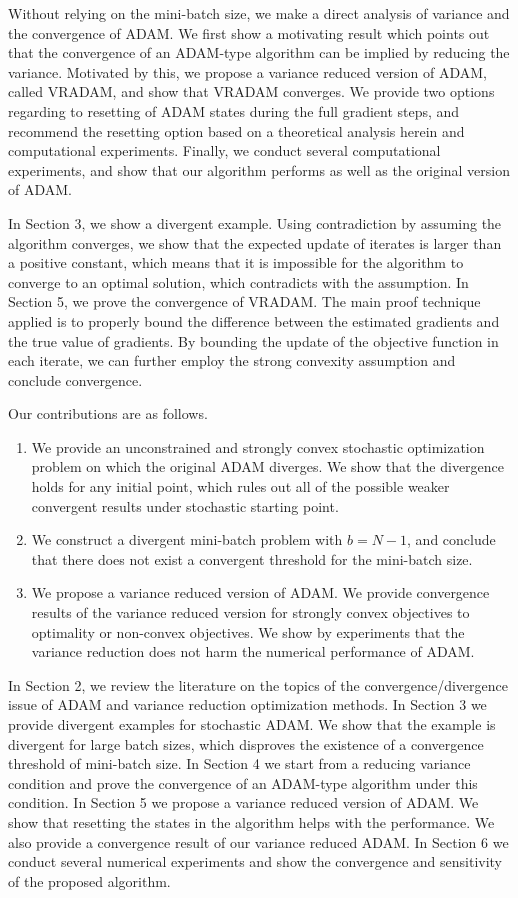 \documentclass[twoside]{article}
\begin{document}
Without relying on the mini-batch size, we make a direct analysis of variance and the convergence of ADAM. We first show a motivating result which points out that the convergence of an ADAM-type algorithm can be implied by reducing the variance. Motivated by this, we propose a variance reduced version of ADAM, called VRADAM, and show that VRADAM converges. We provide two options regarding to resetting of ADAM states during the full gradient steps, and recommend the resetting option based on a theoretical analysis herein and computational experiments. Finally, we conduct several computational experiments, and show that our algorithm performs as well as the original version of ADAM.

In Section 3, we show a divergent example. Using contradiction by assuming the algorithm converges, we show that the expected update of iterates is larger than a positive constant, which means that it is impossible for the algorithm to converge to an optimal solution, which contradicts with the assumption. In Section 5, we prove the convergence of VRADAM. The main proof technique applied is to properly bound the difference between the estimated gradients and the true value of gradients. By bounding the update of the objective function in each iterate, we can further employ the strong convexity assumption and conclude convergence.

Our contributions are as follows.
\begin{enumerate}
    \item We provide an unconstrained and strongly convex stochastic optimization problem on which the original ADAM diverges. We show that the divergence holds for any initial point, which rules out all of the possible weaker convergent results under stochastic starting point.
    \item We construct a divergent mini-batch problem with $b=N-1$, and conclude that there does not exist a convergent threshold for the mini-batch size.
    \item We propose a variance reduced version of ADAM. We provide convergence results of the variance reduced version for strongly convex objectives to optimality or non-convex objectives. We show by experiments that the variance reduction does not harm the numerical performance of ADAM.
\end{enumerate}

In Section 2, we review the literature on the topics of the convergence/divergence issue of ADAM and variance reduction optimization methods. In Section 3 we provide divergent examples for stochastic ADAM. We show that the example is divergent for large batch sizes, which disproves the existence of a convergence threshold of mini-batch size. In Section 4 we start from a reducing variance condition and prove the convergence of an ADAM-type algorithm under this condition. In Section 5 we propose a variance reduced version of ADAM. We show that resetting the states in the algorithm helps with the performance. We also provide a convergence result of our variance reduced ADAM. In Section 6 we conduct several numerical experiments and show the convergence and sensitivity of the proposed algorithm.
\end{document}
